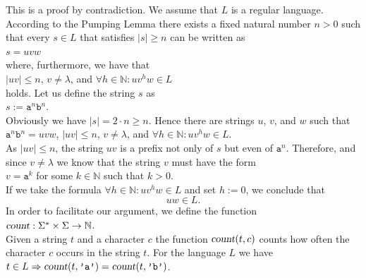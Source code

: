\proofEng
This is a proof by contradiction. We assume that $L$ is a regular language.  According to the
Pumping Lemma there exists a fixed natural number $n>0$ such that every $s \in L$ that satisfies  $|s|
\geq n$ can be written as
\\[0.2cm]
\hspace*{1.3cm}
$s = uvw$
\\[0.2cm]
where, furthermore, we have that
\\[0.2cm]
\hspace*{1.3cm}
$|uv| \leq n$, \quad $v \not= \lambda$, \quad and \quad $\forall h \in \mathbb{N}: uv^h w \in L$
\\[0.2cm]
holds.  Let us define the string $s$ as
\\[0.2cm]
\hspace*{1.3cm}
$s := \mathtt{a}^{n} \mathtt{b}^{n}$.
\\[0.2cm]
Obviously we have $|s| = 2 \cdot n \geq n$.  Hence there are strings $u$, $v$, and $w$
such that 
\\[0.2cm]
\hspace*{1.3cm}
$\mathtt{a}^{n}\mathtt{b}^{n} = uvw$, \quad $|uv| \leq n$, \quad $v \not= \lambda$, 
\quad and \quad $\forall h \in \mathbb{N}: uv^h w \in L$.
\\[0.2cm]
As $|uv| \leq n$, the string $uv$ is a prefix not only of $s$ but even of $\mathtt{a}^n$. Therefore,
and since $v \not= \lambda$ we know that the string $v$ must have the form
\\[0.2cm]
\hspace*{1.3cm}
$v = \mathtt{a}^k$ \quad for some $k \in \mathbb{N}$ such that $k > 0$.
\\[0.2cm]
If we take the formula $\forall h \in \mathbb{N}: uv^h w \in L$ and set  $h:=0$, we conclude that
\begin{equation}
  \label{eq:pumping5}
 uw \in L. 
\end{equation}
In order to facilitate our argument, we define the function
\\[0.2cm]
\hspace*{1.3cm}
$\textsl{count}: \Sigma^* \times \Sigma \rightarrow \mathbb{N}$.
\\[0.2cm]
Given a  string $t$ and a character $c$ the function $\textsl{count}(t,c)$ counts how often the
character $c$ occurs in the string $t$.  For the language  $L$ we have
\\[0.2cm]
\hspace*{1.3cm}
$t \in L \Rightarrow \textsl{count}(t,\texttt{'a'}) = \textsl{count}(t, \texttt{'b'})$. 
